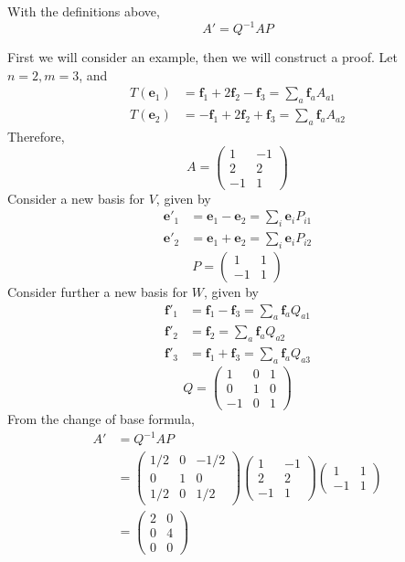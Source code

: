 \documentclass{article}
\begin{document}
	\begin{proposition}
		With the definitions above,
		\[ A' = Q^{-1}AP \]
	\end{proposition}
	\noindent First we will consider an example, then we will construct a proof. Let $n=2, m=3$, and
	\begin{align*}
		T(\bm e_1) &= \bm f_1 + 2\bm f_2 - \bm f_3 = \sum_a \bm f_a A_{a1} \\
		T(\bm e_2) &= -\bm f_1 + 2\bm f_2 + \bm f_3 = \sum_a \bm f_a A_{a2}
	\end{align*}
	Therefore,
	\[ A = \begin{pmatrix}
		1 & -1 \\ 2 & 2 \\ -1 & 1
	\end{pmatrix} \]
	Consider a new basis for $V$, given by
	\begin{align*}
		\bm e'_1 &= \bm e_1 - \bm e_2 = \sum_i \bm e_i P_{i1} \\
		\bm e'_2 &= \bm e_1 + \bm e_2 = \sum_i \bm e_i P_{i2}
	\end{align*}
	\[ P = \begin{pmatrix}
		1 & 1 \\ -1 & 1
	\end{pmatrix} \]
	Consider further a new basis for $W$, given by
	\begin{align*}
		\bm f'_1 &= \bm f_1 - \bm f_3 = \sum_a \bm f_a Q_{a1} \\
		\bm f'_2 &= \bm f_2 = \sum_a \bm f_a Q_{a2} \\
		\bm f'_3 &= \bm f_1 + \bm f_3 = \sum_a \bm f_a Q_{a3}
	\end{align*}
	\[ Q = \begin{pmatrix}
		1 & 0 & 1 \\
		0 & 1 & 0 \\
		-1 & 0 & 1
	\end{pmatrix} \]
	From the change of base formula,
	\begin{align*}
		A' &= Q^{-1}AP \\
		&= \begin{pmatrix}
			1/2 & 0 & -1/2 \\
			0 & 1 & 0 \\
			1/2 & 0 & 1/2
		\end{pmatrix}\begin{pmatrix}
			1 & -1 \\ 2 & 2 \\ -1 & 1
		\end{pmatrix}\begin{pmatrix}
			1 & 1 \\ -1 & 1
		\end{pmatrix} \\
		&= \begin{pmatrix}
			2 & 0 \\ 0 & 4 \\ 0 & 0
		\end{pmatrix}
	\end{align*}
\end{document}
